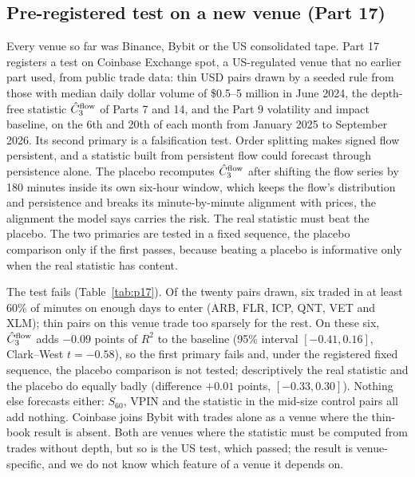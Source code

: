 \subsection{Pre-registered test on a new venue (Part 17)}\label{sec:p17}
Every venue so far was Binance, Bybit or the US consolidated tape. Part 17 registers a test on Coinbase Exchange spot, a US-regulated venue that no earlier part used, from public trade data: thin USD pairs drawn by a seeded rule from those with median daily dollar volume of \$0.5--5 million in June 2024, the depth-free statistic $\hat C_3^{\rm flow}$ of Parts 7 and 14, and the Part 9 volatility and impact baseline, on the 6th and 20th of each month from January 2025 to September 2026. Its second primary is a falsification test. Order splitting makes signed flow persistent, and a statistic built from persistent flow could forecast through persistence alone. The placebo recomputes $\hat C_3^{\rm flow}$ after shifting the flow series by 180 minutes inside its own six-hour window, which keeps the flow's distribution and persistence and breaks its minute-by-minute alignment with prices, the alignment the model says carries the risk. The real statistic must beat the placebo. The two primaries are tested in a fixed sequence, the placebo comparison only if the first passes, because beating a placebo is informative only when the real statistic has content.

The test fails (Table~\ref{tab:p17}). Of the twenty pairs drawn, six traded in at least 60\% of minutes on enough days to enter (ARB, FLR, ICP, QNT, VET and XLM); thin pairs on this venue trade too sparsely for the rest. On these six, $\hat C_3^{\rm flow}$ adds $-0.09$ points of $R^2$ to the baseline (95\% interval $[-0.41,0.16]$, Clark--West $t=-0.58$), so the first primary fails and, under the registered fixed sequence, the placebo comparison is not tested; descriptively the real statistic and the placebo do equally badly (difference $+0.01$ points, $[-0.33,0.30]$). Nothing else forecasts either: $S_{60}$, VPIN and the statistic in the mid-size control pairs all add nothing. Coinbase joins Bybit with trades alone as a venue where the thin-book result is absent. Both are venues where the statistic must be computed from trades without depth, but so is the US test, which passed; the result is venue-specific, and we do not know which feature of a venue it depends on.

